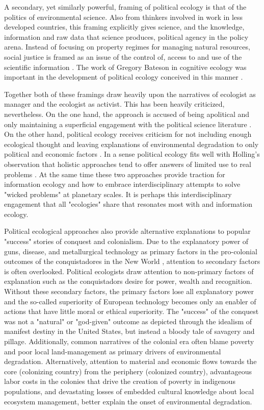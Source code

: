 A secondary, yet similarly powerful, framing of political ecology is that of the politics of environmental science. Also from thinkers involved in work in less developed countries, this framing explicitly gives science, and the knowledge, information and raw data that science produces, political agency in the policy arena. Instead of focusing on property regimes for managing natural resources, social justice is framed as an issue of the control of, access to and use of the scientific information \citep{forsyth_2003,leach_1996}. The work of Gregory Bateson in cognitive ecology was important in the development of political ecology conceived in this manner \citep{peet_1996}.

Together both of these framings draw heavily upon the narratives of ecologist as manager and the ecologist as activist. This has been heavily criticized, nevertheless. On the one hand, the approach is accused of being apolitical and only maintaining a superficial engagement with the political science literature \citep{walker_2007}. On the other hand, political ecology receives criticism for not including enough ecological thought and leaving explanations of environmental degradation to only political and economic factors \citep{vayda_1999,walker_2005}. In a sense political ecology fits well with Holling's observation that holistic approaches tend to offer answers of limited use to real problems \citep{holling_1998}. At the same time these two approaches provide traction for information ecology and how to embrace interdisciplinary attempts to solve "wicked problems" at planetary scales. It is perhaps this interdisciplinary engagement that all "ecologies" share that resonates most with and information ecology.

Political ecological approaches also provide alternative explanations to popular "success" stories of conquest and colonialism. Due to the explanatory power of guns, disease, and metallurgical technology as primary factors in the pro-colonial outcomes of the conquistadores in the New World \citep[cf.][]{diamond_1997}, attention to secondary factors is often overlooked. Political ecologists draw attention to non-primary factors of explanation such as the conquistadors desire for power, wealth and recognition. Without these secondary factors, the primary factors lose all explanatory power and the so-called superiority of European technology becomes only an enabler of actions that have little moral or ethical superiority. The "success" of the conquest was not a "natural" or "god-given" outcome as depicted through the idealism of manifest destiny in the United States, but instead a bloody tale of savagery and pillage. Additionally, common narratives of the colonial era often blame poverty and poor local land-management as primary drivers of environmental degradation. Alternatively, attention to material and economic flows towards the core (colonizing country) from the periphery (colonized country), advantageous labor costs in the colonies that drive the creation of poverty in indigenous populations, and devastating losses of embedded cultural knowledge about local ecosystem management, better explain the onset of environmental degradation.

